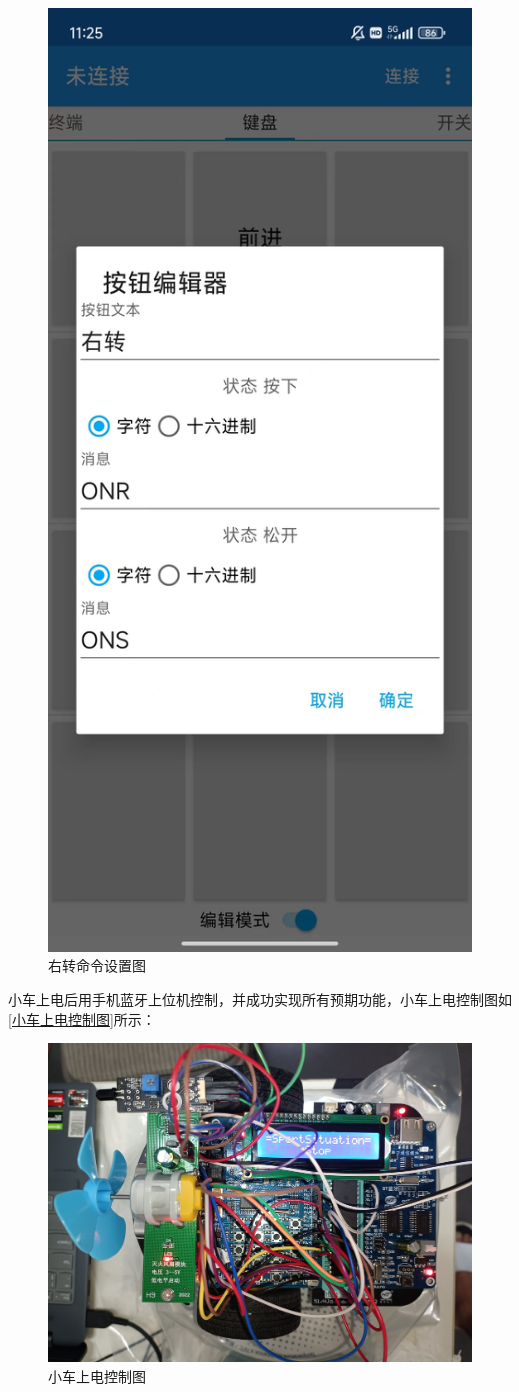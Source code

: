 \begin{figure}[htbp]
\begin{minipage}{0.49\linewidth}
		\includegraphics[width=0.6\linewidth]{figures/右转命令设置.jpg}
		\caption{右转命令设置图}
		\label{右转命令设置}%
	\end{minipage}
\end{figure}
\newline

小车上电后用手机蓝牙上位机控制，并成功实现所有预期功能，小车上电控制图如\autoref{小车上电控制图}所示：
\begin{figure}[!htbp]
    \centering
    \includegraphics[width =\textwidth]{figures/上电顶视图.jpg}
    \caption{小车上电控制图}
    \label{小车上电控制图}
\end{figure}